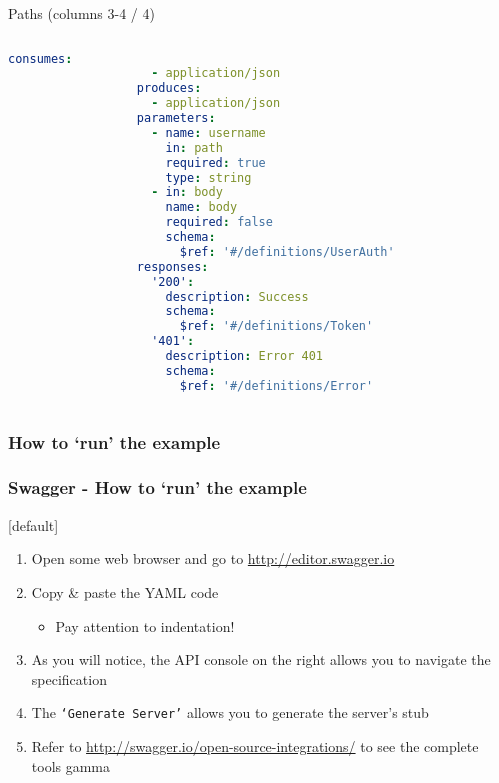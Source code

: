 \begin{frame}
\begin{exampleblock}{Paths (columns 3-4 / 4)}
\begin{columns}
		\begin{column}{0.48\textwidth}
		\begin{lstlisting}[language=yaml,basicstyle=\tiny]
			      consumes:
			        - application/json
			      produces:
			        - application/json
			      parameters:
			        - name: username
			          in: path
			          required: true
			          type: string
			        - in: body
			          name: body
			          required: false
			          schema:
			            $ref: '#/definitions/UserAuth'
			      responses:
			        '200':
			          description: Success
			          schema:
			            $ref: '#/definitions/Token'
			        '401':
			          description: Error 401
			          schema:
			            $ref: '#/definitions/Error'
		\end{lstlisting}
		\end{column}
		
		\end{columns}
	\end{exampleblock}

\end{frame}

\subsubsection{How to `run' the example}

\begin{frame}
	\frametitle{Swagger - How to `run' the example}
	
	[default]
	\begin{enumerate}
		\item Open some web browser and go to \url{http://editor.swagger.io}
		\item Copy \& paste the YAML code
		\begin{itemize}
			\item Pay attention to indentation!
		\end{itemize}
		\item As you will notice, the API console on the right allows you to navigate the specification
		\item The \texttt{`Generate Server'} allows you to generate the server's stub
		\item Refer to \url{http://swagger.io/open-source-integrations/} to see the complete tools gamma
	\end{enumerate}
\end{frame}